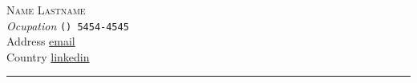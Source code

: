 \documentclass[11pt, a4paper]{article}
\begin{document}
\noindent
\textsc{\huge Name Lastname}\\
\emph{Ocupation}        \hfill      \faPhone        \space  \footnotesize{\texttt{() 5454-4545}\\
Address                 \hfill      \faEnvelope     \space  \href{mailto:email}{email}\\
Country                 \hfill      \faLinkedin     \space  \href{linkedin}{linkedin}}\\[.2cm]
{\color{Black} \par\noindent\rule{\textwidth}{0.4pt} }


\onehalfspacing
\end{document}
